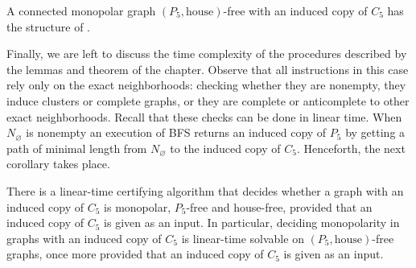 \begin{corollary}
    A connected monopolar graph $(P_5,\text{house})$-free with an induced copy
    of $C_5$ has the structure of .
\end{corollary}

Finally, we are left to discuss the time complexity of the procedures described
by the lemmas and theorem of the chapter. Observe that all instructions in this
case rely only on the exact neighborhoods: checking whether they are nonempty,
they induce clusters or complete graphs, or they are complete or anticomplete to
other exact neighborhoods. Recall that these checks can be done in linear time.
When $N_\varnothing$ is nonempty an execution of BFS returns an induced copy of
$P_5$ by getting a path of minimal length from $N_\varnothing$ to the induced
copy of $C_5$. Henceforth, the next corollary takes place.

\begin{corollary}
    \label{cor:algorithm_c5}
    There is a linear-time certifying algorithm that decides whether a graph
    with an induced copy of $C_5$ is monopolar, $P_5$-free and house-free,
    provided that an induced copy of $C_5$ is given as an input. In particular,
    deciding monopolarity in graphs with an induced copy of $C_5$ is linear-time
    solvable on $(P_5,\text{house})$-free graphs, once more provided that an
    induced copy of $C_5$ is given as an input.
\end{corollary}